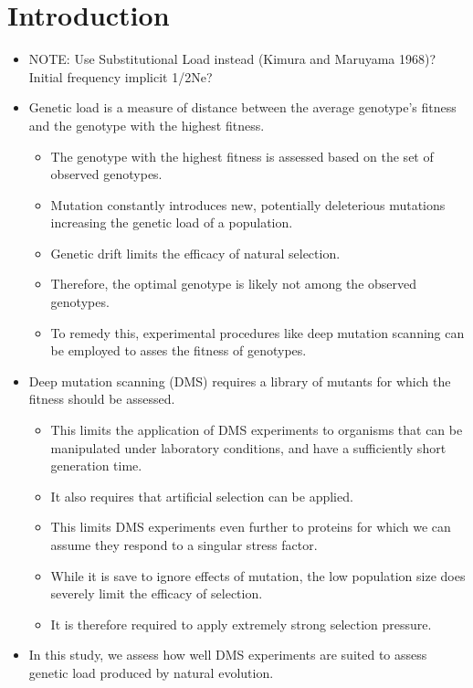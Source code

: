 \documentclass[12pt]{article}
\begin{document}
\section*{Introduction}
\begin{itemize}
	\item NOTE: Use Substitutional Load instead (Kimura and Maruyama 1968)? Initial frequency implicit 1/2Ne?
	\item Genetic load is a measure of distance between the average genotype's fitness and the genotype with the highest fitness.
	\begin{itemize}
		\item The genotype with the highest fitness is assessed based on the set of observed genotypes.
		\item Mutation constantly introduces new, potentially deleterious mutations increasing the genetic load of a population.
		\item Genetic drift limits the efficacy of natural selection.
		\item Therefore, the optimal genotype is likely not among the observed genotypes.
		\item To remedy this, experimental procedures like deep mutation scanning can be employed to asses the fitness of genotypes.
	\end{itemize}
	\item Deep mutation scanning (DMS) requires a library of mutants for which the fitness should be assessed.
	\begin{itemize}
		\item This limits the application of DMS experiments to organisms that can be manipulated under laboratory conditions, and have a sufficiently short generation time.
		\item It also requires that artificial selection can be applied.
		\item This limits DMS experiments even further to proteins for which we can assume they respond to a singular stress factor.
		\item While it is save to ignore effects of mutation, the low population size does severely limit the efficacy of selection.
		\item It is therefore required to apply extremely strong selection pressure.
	\end{itemize}
	\item In this study, we assess how well DMS experiments are suited to assess genetic load produced by natural evolution.
	\begin{itemize}

\end{itemize}
\end{itemize}
\end{document}
